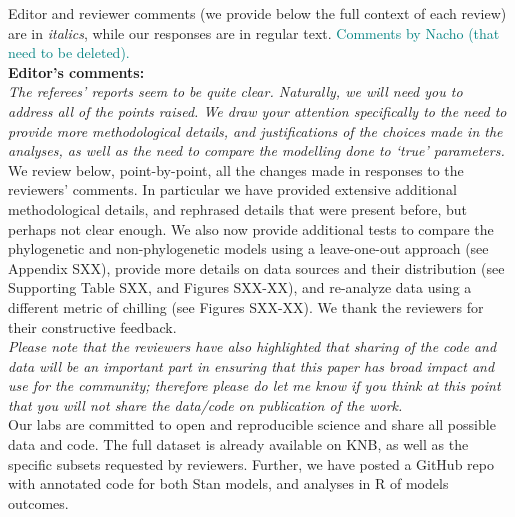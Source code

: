 \documentclass[11pt]{article}
\begin{document}
Editor and reviewer comments (we provide below the full context of each review) are in \emph{italics}, while our responses are in regular text. 
\textcolor{teal}{Comments by Nacho (that need to be deleted).}
\\ %

{\bf Editor's comments:} \\


\emph{The referees’ reports seem to be quite clear. Naturally, we will need you to address all of the points raised. We draw your attention specifically to the need to provide more methodological details, and justifications of the choices made in the analyses, as well as the need to compare the modelling done to `true' parameters.}\\

We review below, point-by-point, all the changes made in responses to the reviewers' comments. In particular we have provided extensive additional methodological details, and rephrased details that were present before, but perhaps not clear enough. We also now provide additional tests to compare the phylogenetic and non-phylogenetic models using a leave-one-out approach (see Appendix SXX), provide more details on data sources and their distribution (see Supporting Table SXX, and Figures SXX-XX), and re-analyze data using a different metric of chilling (see Figures SXX-XX). We thank the reviewers for their constructive feedback.\\

\emph{Please note that the reviewers have also highlighted that sharing of the code and data will be an important part in ensuring that this paper has broad impact and use for the community; therefore please do let me know if you think at this point that you will not share the data/code on publication of the work.}\\

Our labs are committed to open and reproducible science and share all possible data and code. The full dataset is already available on KNB, as well as the specific subsets requested by reviewers. Further, we have posted a GitHub repo with annotated code for both Stan models, and analyses in R of models outcomes.\\
\end{document}
